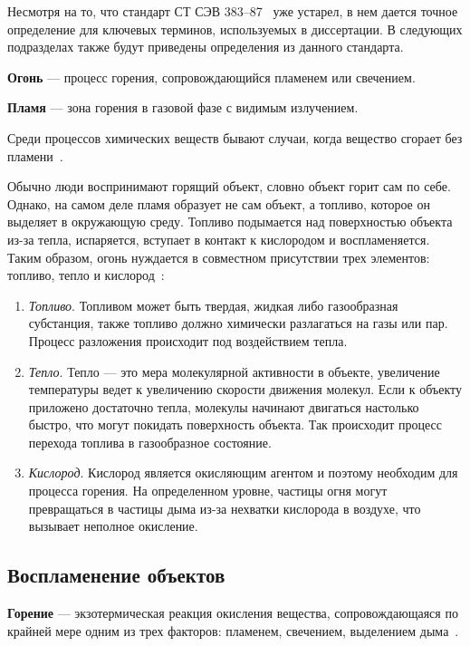 Несмотря на то, что стандарт СТ СЭВ 383--87~\cite{383-87} уже устарел, в нем
дается точное определение для ключевых терминов, используемых в диссертации. В
следующих подразделах также будут приведены определения из данного стандарта.

\textbf{Огонь} --- процесс горения, сопровождающийся пламенем или свечением.

\textbf{Пламя} --- зона горения в газовой фазе с видимым излучением.

Среди процессов химических веществ бывают случаи, когда вещество сгорает без
пламени~\cite{WikiFire}.

Обычно люди воспринимают горящий объект, словно объект горит сам по себе.
Однако, на самом деле пламя образует не сам объект, а топливо, которое он
выделяет в окружающую среду. Топливо подымается над поверхностью объекта из-за
тепла, испаряется, вступает в контакт к кислородом и воспламеняется. Таким
образом, огонь нуждается в совместном присутствии трех элементов: топливо, тепло
и кислород~\cite{USArmy}:
\begin{enumerate}
    \item \emph{Топливо}. Топливом может быть твердая, жидкая либо газообразная
        субстанция, также топливо должно химически разлагаться на газы или
        пар. Процесс разложения происходит под воздействием тепла.
    \item \emph{Тепло}. Тепло --- это мера молекулярной активности в объекте,
        увеличение температуры ведет к увеличению скорости движения молекул.
        Если к объекту приложено достаточно тепла, молекулы начинают двигаться
        настолько быстро, что могут покидать поверхность объекта. Так происходит
        процесс перехода топлива в газообразное состояние.
    \item \emph{Кислород}. Кислород является окисляющим агентом и поэтому
        необходим для процесса горения. На определенном уровне, частицы огня
        могут превращаться в частицы дыма из-за нехватки кислорода в воздухе,
        что вызывает неполное окисление.
\end{enumerate}

\subsection{Воспламенение объектов}

\textbf{Горение} --- экзотермическая реакция окисления вещества,
сопровождающаяся по крайней мере одним из трех факторов: пламенем, свечением,
выделением дыма~\cite{383-87}.

